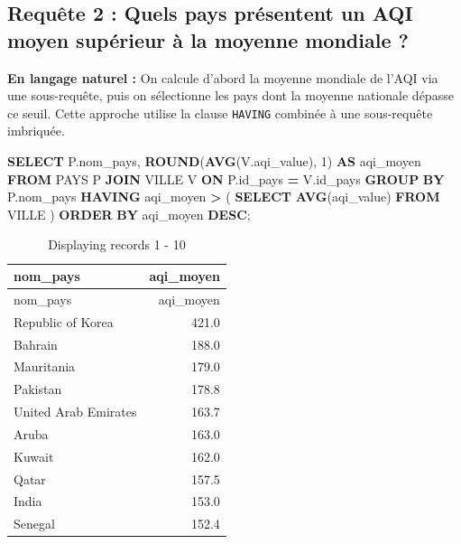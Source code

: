 \documentclass[mstat,12pt]{unswthesis}
\newenvironment{Shaded}{\begin{snugshade}}{\end{snugshade}}
\newcommand{\DecValTok}[1]{\textcolor[rgb]{0.00,0.00,0.81}{#1}}
\newcommand{\FunctionTok}[1]{\textcolor[rgb]{0.13,0.29,0.53}{\textbf{#1}}}
\newcommand{\KeywordTok}[1]{\textcolor[rgb]{0.13,0.29,0.53}{\textbf{#1}}}
\newcommand{\NormalTok}[1]{#1}
\newcommand{\OperatorTok}[1]{\textcolor[rgb]{0.81,0.36,0.00}{\textbf{#1}}}
\begin{document}
\subsection{Requête 2 : Quels pays présentent un AQI moyen supérieur à
la moyenne mondiale
?}\label{requuxeate-2-quels-pays-pruxe9sentent-un-aqi-moyen-supuxe9rieur-uxe0-la-moyenne-mondiale}

\textbf{En langage naturel :} On calcule d'abord la moyenne mondiale de
l'AQI via une sous-requête, puis on sélectionne les pays dont la moyenne
nationale dépasse ce seuil. Cette approche utilise la clause
\texttt{HAVING} combinée à une sous-requête imbriquée.

\begin{Shaded}
\begin{Highlighting}[]
\KeywordTok{SELECT}\NormalTok{ P.nom\_pays,}
       \FunctionTok{ROUND}\NormalTok{(}\FunctionTok{AVG}\NormalTok{(V.aqi\_value), }\DecValTok{1}\NormalTok{) }\KeywordTok{AS}\NormalTok{ aqi\_moyen}
\KeywordTok{FROM}\NormalTok{ PAYS  P}
\KeywordTok{JOIN}\NormalTok{ VILLE V }\KeywordTok{ON}\NormalTok{ P.id\_pays }\OperatorTok{=}\NormalTok{ V.id\_pays}
\KeywordTok{GROUP} \KeywordTok{BY}\NormalTok{ P.nom\_pays}
\KeywordTok{HAVING}\NormalTok{ aqi\_moyen }\OperatorTok{\textgreater{}}\NormalTok{ (}
           \KeywordTok{SELECT} \FunctionTok{AVG}\NormalTok{(aqi\_value)}
           \KeywordTok{FROM}\NormalTok{ VILLE}
\NormalTok{         )}
\KeywordTok{ORDER} \KeywordTok{BY}\NormalTok{ aqi\_moyen }\KeywordTok{DESC}\NormalTok{;}
\end{Highlighting}
\end{Shaded}

\begin{longtable}[]{@{}lr@{}}
\caption{Displaying records 1 - 10}\tabularnewline
\toprule\noalign{}
nom\_pays & aqi\_moyen \\
\midrule\noalign{}
\endfirsthead
\toprule\noalign{}
nom\_pays & aqi\_moyen \\
\midrule\noalign{}
\endhead
\bottomrule\noalign{}
\endlastfoot
Republic of Korea & 421.0 \\
Bahrain & 188.0 \\
Mauritania & 179.0 \\
Pakistan & 178.8 \\
United Arab Emirates & 163.7 \\
Aruba & 163.0 \\
Kuwait & 162.0 \\
Qatar & 157.5 \\
India & 153.0 \\
Senegal & 152.4 \\
\end{longtable}
\end{document}
